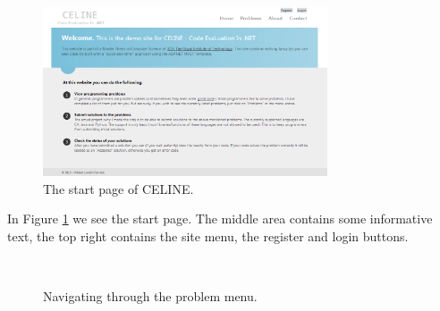 \begin{figure}[h]
	\centering
	\includegraphics[width=0.75\textwidth]{sections/media/celine_startpage.png}
	\caption{The start page of CELINE.}
	\label{fig:celine_startpage}
\end{figure}

In Figure \ref{fig:celine_startpage} we see the start page. The middle area contains some informative text, the top right contains the site menu, the register and login buttons.

\begin{figure}[h]
\centering
\mbox{
}
\caption{Navigating through the problem menu.}
\label{fig:celine_split_problemlist_easysort}
\end{figure}

